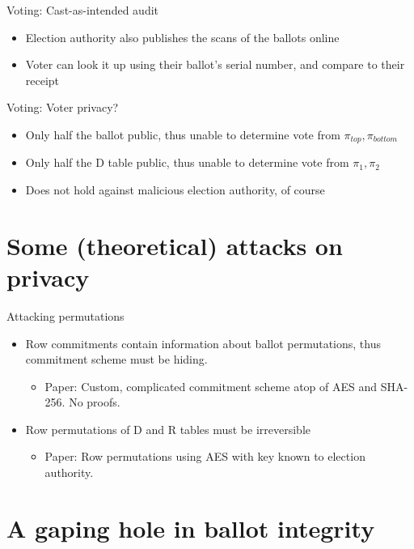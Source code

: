 \documentclass{beamer}
\begin{document}
\begin{frame}{Voting: Cast-as-intended audit}
	\begin{itemize}
		\item Election authority also publishes the scans of the ballots online
		\item Voter can look it up using their ballot's serial number, and compare to their receipt
	\end{itemize}
\end{frame}

\begin{frame}{Voting: Voter privacy?}
	\begin{itemize}
		\item Only half the ballot public, thus unable to determine vote from $\pi_{top}, \pi_{bottom}$
		\item Only half the D table public, thus unable to determine vote from $\pi_1, \pi_2$
		\item Does not hold against malicious election authority, of course
	\end{itemize}
\end{frame}

\section{Some (theoretical) attacks on privacy}

\begin{frame}{Attacking permutations}
	\begin{itemize}
		\item Row commitments contain information about ballot
			permutations, thus commitment scheme must be hiding.
			\begin{itemize}
				\item Paper: Custom, complicated commitment
					scheme atop of AES and SHA-256. No
					proofs.
			\end{itemize}
		\item Row permutations of D and R tables must be irreversible
			\begin{itemize}
				\item Paper: Row permutations using AES with key known to election authority.
			\end{itemize}
	\end{itemize}
\end{frame}

\section{A gaping hole in ballot integrity}
\end{document}
